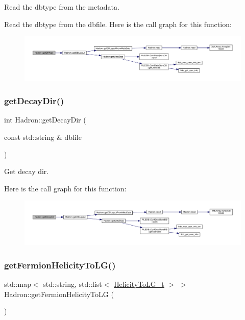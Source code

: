 Read the dbtype from the metadata. 

Read the dbtype from the dbfile. Here is the call graph for this function\+:\nopagebreak
\begin{figure}[H]
\begin{center}
\leavevmode
\includegraphics[width=350pt]{d1/daf/namespaceHadron_a82284ec1545a1a6b6794da8d973a1d57_cgraph}
\end{center}
\end{figure}
\mbox{\label{namespaceHadron_ae5c5e7cd57aa116ce56262bf00762610}} 
\subsubsection{\texorpdfstring{getDecayDir()}{getDecayDir()}}
{\footnotesize\ttfamily int Hadron\+::get\+Decay\+Dir (\begin{DoxyParamCaption}\item[{const std\+::string \&}]{dbfile }\end{DoxyParamCaption})}



Get decay dir. 

Here is the call graph for this function\+:\nopagebreak
\begin{figure}[H]
\begin{center}
\leavevmode
\includegraphics[width=350pt]{d1/daf/namespaceHadron_ae5c5e7cd57aa116ce56262bf00762610_cgraph}
\end{center}
\end{figure}
\mbox{\label{namespaceHadron_af7b75d50b2ca47d90a4d42ff7152bf4d}} 
\subsubsection{\texorpdfstring{getFermionHelicityToLG()}{getFermionHelicityToLG()}}
{\footnotesize\ttfamily std\+::map$<$ std\+::string, std\+::list$<$ \mbox{\hyperlink{structHadron_1_1HelicityToLG__t}{Helicity\+To\+L\+G\+\_\+t}} $>$ $>$ Hadron\+::get\+Fermion\+Helicity\+To\+LG (\begin{DoxyParamCaption}{ }\end{DoxyParamCaption})}




